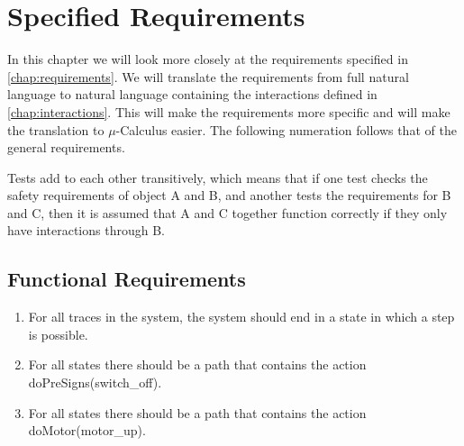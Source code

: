 \chapter{Specified Requirements} \label{chap:tests}



In this chapter we will look more closely at the requirements specified in \cref{chap:requirements}. 
We will translate the requirements from full natural language to natural language containing the interactions defined in \cref{chap:interactions}.
This will make the requirements more specific and will make the translation to $\mu$-Calculus easier.
The following numeration follows that of the general requirements.

Tests add to each other transitively,
which means that if one test checks the safety requirements of object A and B,
and another tests the requirements for B and C,
then it is assumed that A and C together function correctly if they only have interactions through B.


\section{Functional Requirements}

\begin{enumerate}
	\item For all traces in the system, the system should end in a state in which a step is possible.
	


	\item For all states there should be a path that contains the action doPreSigns(switch\_off).
		

	
	\item For all states there should be a path that contains the action doMotor(motor\_up).
	


\end{enumerate}

